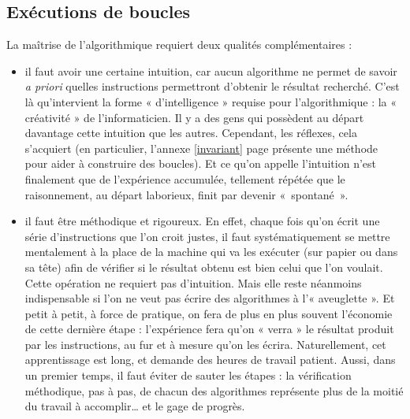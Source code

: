 

\subsection{Exécutions de boucles}\label{sub:executionBoucles}
La maîtrise de l'algorithmique requiert deux qualités complémentaires \cite{darmengeat} :
\begin{itemize}
\item il faut avoir une certaine intuition, car aucun algorithme ne permet de 
	savoir {\em a priori} quelles instructions permettront d'obtenir le résultat 
	recherché. C'est là qu'intervient la forme « d'intelligence » 
	requise pour l'algorithmique : la « créativité » de l'informaticien. 
	Il y a des gens qui possèdent au 
	départ davantage cette intuition que les autres.  
	Cependant, les réflexes, cela s'acquiert (en particulier, l'annexe \ref{invariant}
	page \pageref{invariant} présente une méthode pour aider à construire des boucles). 
	Et ce qu'on appelle l'intuition n'est finalement que de l'expérience accumulée,
	tellement répétée que le raisonnement, au départ laborieux, finit par 
	devenir «~spontané~».
\item il faut être méthodique et rigoureux. En effet, chaque fois qu'on écrit 
	une série d'instructions que l'on croit justes, il faut systématiquement 
	se mettre mentalement à la place de la machine qui va les exécuter
	(sur papier ou dans sa tête) afin de vérifier si le résultat obtenu 
	est bien celui que l'on voulait. 
	Cette opération ne requiert pas d'intuition. Mais elle reste néanmoins indispensable
	si l'on ne veut pas écrire des algorithmes à l'« aveuglette ».
	Et petit à petit, à force de pratique, on fera
	de plus en plus souvent l'économie de cette dernière étape : 
	l'expérience fera qu'on « verra » le résultat produit par les instructions, 
	au fur et à mesure qu'on les écrira. 
	Naturellement, cet apprentissage est long, et demande des heures de 
	travail patient. 
	Aussi, dans un premier temps, il faut éviter de sauter les étapes : la vérification méthodique, 
	pas à pas, de chacun des algorithmes représente plus de la moitié du travail à accomplir\ldots
	et le gage de progrès.
\end{itemize}

